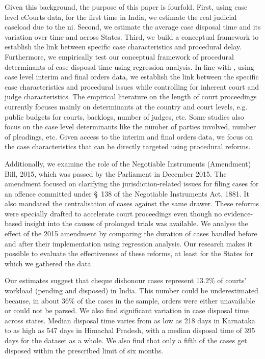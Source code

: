 \documentclass[12pt,a4paper]{article}
\begin{document}
Given this background, the purpose of this paper is fourfold. First, using case level eCourts data, for the first time in India, we estimate the real judicial caseload due to the \gls{ni}. Second, we estimate the average case disposal time and its variation over time and across States. Third, we build a conceptual framework to establish the link between specific case characteristics and procedural delay. Furthermore, we empirically test our conceptual framework of procedural determinants of case disposal time using regression analysis. In line with \textcite{bielen2015}, using case level interim and final orders data, we establish the link between the specific case characteristics and procedural issues while controlling for inherent court and judge characteristics. The empirical literature on the length of court proceedings currently focuses mainly on determinants at the country and court levels, e.g. public budgets for courts, backlogs, number of judges, etc. Some studies also focus on the case level determinants like the number of parties involved, number of pleadings, etc. Given access to the interim and final orders data, we focus on the case characteristics that can be directly targeted using procedural reforms.

Additionally, we examine the role of the Negotiable Instruments (Amendment) Bill, 2015, which was passed by the Parliament in December 2015. The amendment focused on clarifying the jurisdiction-related issues for filing cases for an offence committed under \S~138 of the Negotiable Instruments Act, 1881. It also mandated the centralisation of cases against the same drawer. These reforms were specially drafted to accelerate court proceedings even though no evidence-based insight into the causes of prolonged trials was available. We analyse the effect of the 2015 amendment by comparing the duration of cases handled before and after their implementation using regression analysis. Our research makes it possible to evaluate the effectiveness of these reforms, at least for the States for which we gathered the data.

Our estimates suggest that cheque dishonour cases represent 13.2\% of courts' workload (pending and disposed) in India. This number could be underestimated because, in about 36\% of the cases in the sample, orders were either unavailable or could not be parsed. We also find significant variation in case disposal time across states. Median disposal time varies from as low as 218 days in Karnataka to as high as 547 days in Himachal Pradesh, with a median disposal time of 395 days for the dataset as a whole. We also find that only a fifth of the cases get disposed within the prescribed limit of six months.
\end{document}
